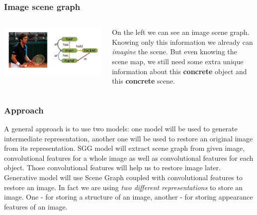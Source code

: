 \documentclass[10pt]{beamer}
\begin{document}
\begin{frame}
    \frametitle{Image scene graph}
    \begin{columns}
        \begin{column}{0.5\textwidth}
            \includegraphics[width=\textwidth]{figure/image-and-scene-graph.png}
        \end{column}
        \begin{column}{0.5\textwidth}
            On the left we can see an image scene graph. Knowing only this information we already can \textit{imagine} the scene. But even knowing the scene map, we still need some extra unique information about this \textbf{concrete} object and this \textbf{concrete} scene.
        \end{column}
    \end{columns}
\end{frame}

\begin{frame}
    \frametitle{Approach}
    A general approach is to use two models: one model will be used to generate intermediate representation, another one will be used to restore an original image from its representation.
    \vspace{5pt}
    SGG model will extract scene graph from given image, convolutional features for a whole image as well as convolutional features for each object. Those convolutional features will help us to restore image later.
    \vspace{5pt}
    Generative model will use Scene Graph coupled with convolutional features to restore an image.
    \vspace{5pt}
    In fact we are using \textit{two different representations} to store an image. One - for storing a structure of an image, another - for storing appearance features of an image.

\end{frame}
\end{document}
